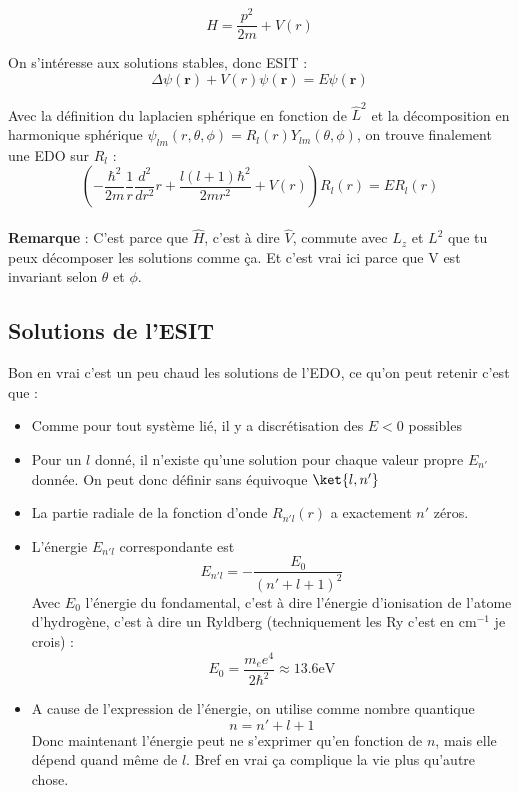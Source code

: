 \documentclass[a4paper]{report}
\begin{document}
\begin{equation}
H=\dfrac{p^2}{2m}+V(r)
\end{equation}

On s’intéresse aux solutions stables, donc ESIT : \begin{equation}
\Delta \psi (\bm r) + V(r) \psi (\bm r) = E \psi (\bm r)
\end{equation}

Avec la définition du laplacien sphérique en fonction de $\hat L^2$ et la décomposition en harmonique sphérique $\psi_{lm}(r,\theta,\phi)=R_{l}(r)Y_{lm}(\theta,\phi)$, on trouve finalement une EDO sur $R_l$ : \begin{equation}
\left(-\dfrac{\hbar^2}{2m}\dfrac{1}{r}\dfrac{d^2}{dr^2}r + \dfrac{l(l+1)\hbar^2}{2mr^2} + V(r) \right) R_l(r) = E R_l(r)
\end{equation} \\


\textbf{Remarque} : C'est parce que $\hat H$, c'est à dire $\hat V$, commute avec $L_z$ et $L^2$ que tu peux décomposer les solutions comme ça. Et c'est vrai ici parce que V est invariant selon $\theta$ et $\phi$.
\subsection{Solutions de l'ESIT}

Bon en vrai c'est un peu chaud les solutions de l'EDO, ce qu'on peut retenir c'est que : \begin{itemize}
\item Comme pour tout système lié, il y a discrétisation des $E<0$ possibles
\item Pour un $l$ donné, il n'existe qu'une solution pour chaque valeur propre $E_{n'}$ donnée. On peut donc définir sans équivoque $\ket{l,n'}$
\item La partie radiale de la fonction d'onde $R_{n'l}(r)$ a exactement $n'$ zéros.
\item L'énergie $E_{n'l}$ correspondante est \begin{equation}
E_{n'l}=-\dfrac{E_0}{(n'+l+1)^2}
\end{equation}
Avec $E_0$ l'énergie du fondamental, c'est à dire l'énergie d'ionisation de l'atome d'hydrogène, c'est à dire un Ryldberg (techniquement les Ry c'est en $\mathrm{cm}^{-1}$ je crois) : \begin{equation}
E_0=\dfrac{m_e e^4}{2\hbar^2}\approx13.6 \mathrm{eV}
\end{equation}
\item A cause de l'expression de l'énergie, on utilise comme nombre quantique \begin{equation}
n=n'+l+1
\end{equation}  Donc maintenant l'énergie peut ne s'exprimer qu'en fonction de $n$, mais elle dépend quand même de $l$. Bref en vrai ça complique la vie plus qu'autre chose.
\end{itemize}
\end{document}
